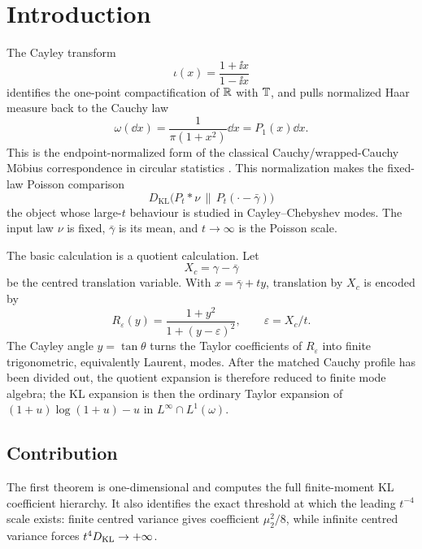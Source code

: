 \section{Introduction}\label{sec:introduction}

The Cayley transform
\[
\iota(x)=\frac{1+\ii x}{1-\ii x}
\]
identifies the one-point compactification of \(\mathbb{R}\) with \(\mathbb{T}\), and pulls
normalized Haar measure back to the Cauchy law
\[
\omega(\dd x)=\frac{1}{\pi(1+x^{2})}\dd x=P_1(x)\dd x .
\]
This is the endpoint-normalized form of the classical Cauchy/wrapped-Cauchy
M{\"o}bius correspondence in circular statistics
\cite{KentTyler1988WrappedCauchy,McCullagh1992CauchyModels,
McCullagh1996CauchyMobius,
KatoJones2010MobiusCircle,KatoMcCullagh2020SphereCauchyMobius}.
This normalization makes the fixed-law Poisson comparison
\begin{equation}\label{eq:intro-main-functional}
D_{\mathrm{KL}}\bigl(P_t*\nu\,\|\,P_t(\cdot-\bar{\gamma})\bigr)
\end{equation}
the object whose large-\(t\) behaviour is studied in Cayley--Chebyshev
modes.  The input law \(\nu\) is fixed, \(\bar{\gamma}\) is its mean, and
\(t\to\infty\) is the Poisson scale.

The basic calculation is a quotient calculation.  Let
\[
X_c=\gamma-\bar{\gamma}
\]
be the centred translation variable.  With \(x=\bar{\gamma}+ty\), translation
by \(X_c\) is encoded by
\[
R_\varepsilon(y)=\frac{1+y^2}{1+(y-\varepsilon)^2},
\qquad \varepsilon=X_c/t .
\]
The Cayley angle \(y=\tan\theta\) turns the Taylor coefficients of
\(R_\varepsilon\) into finite trigonometric, equivalently Laurent, modes.
After the matched Cauchy profile has been divided out, the quotient expansion
is therefore reduced to finite mode algebra; the KL expansion is then the
ordinary Taylor expansion of \((1+u)\log(1+u)-u\) in
\(L^\infty\cap L^1(\omega)\).

\subsection*{Contribution}

The first theorem is one-dimensional and computes the full finite-moment KL
coefficient hierarchy.  It also identifies the exact threshold at which the
leading \(t^{-4}\) scale exists: finite centred variance gives coefficient
\(\mu_2^2/8\), while infinite centred variance forces
\(t^4D_{\rm KL}\to+\infty\).

